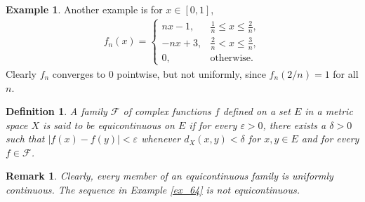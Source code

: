\documentclass[10pt]{book}
\newtheorem{definition}{Definition}[chapter]
\newtheorem{remark}{Remark}[chapter]
\theoremstyle{definition}
\newtheorem{example}{Example}[chapter]
\numberwithin{equation}{chapter}
\begin{document}
\medskip

\begin{example}
Another example is for $x \in [0,1]$,
\begin{align*}
    f_n(x) = \begin{cases}
        nx - 1, & \frac{1}{n} \leq x \leq \frac{2}{n}, \\
        -nx + 3, & \frac{2}{n} < x \leq \frac{3}{n}, \\
        0, & \text{otherwise}.
    \end{cases}
\end{align*}
Clearly $f_n$ converges to $0$ pointwise, but not uniformly, since $f_n(2/n) = 1$ for all $n$.
\end{example}

\medskip

\begin{definition}
A family $\mathscr{F}$ of complex functions $f$ defined on a set $E$ in a metric space $X$ is said to be equicontinuous on $E$ if for every $\varepsilon > 0$, there exists a $\delta > 0$ such that $\left|f(x) - f(y)\right| < \varepsilon$ whenever $d_X(x,y) < \delta$ for $x,y \in E$ and for every $f \in \mathscr{F}$.
\end{definition}

\begin{remark}
Clearly, every member of an equicontinuous family is uniformly continuous. The sequence in Example \ref{ex_64} is not equicontinuous.
\end{remark}

\medskip
\end{document}
